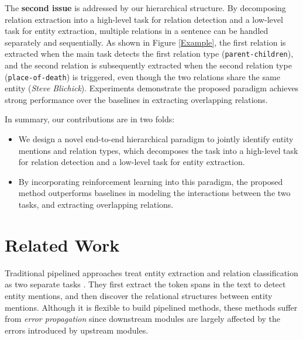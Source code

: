 \documentclass[letterpaper]{article} %
\theoremstyle{definition}
\begin{document}
The \textbf{second issue} is addressed by our hierarchical structure. By decomposing relation extraction into a high-level task for relation detection and a low-level task for entity extraction, multiple relations in a sentence can be handled separately and sequentially. As shown in Figure \ref{Example}, the first relation is extracted when the main task detects the first relation type (\texttt{parent-children}), and the second relation is subsequently extracted when the second relation type (\texttt{place-of-death}) is triggered, even though the two relations share the same entity (\textit{Steve Blichick}). Experiments demonstrate the proposed paradigm achieves strong performance over the baselines in extracting overlapping relations.

In summary, our contributions are in two folds:
\begin{itemize}

\item 
We design a novel end-to-end hierarchical paradigm to jointly identify entity mentions and relation types, which decomposes the task into a high-level task for relation detection and a low-level task for entity extraction. 

\item 
By incorporating reinforcement learning into this paradigm, the proposed method outperforms baselines in modeling the interactions between the two tasks, and extracting overlapping relations.
\end{itemize}



\section{Related Work}

Traditional pipelined approaches treat entity extraction and relation classification as two separate tasks \cite{mintz2009distant,gormley2015improved,tang2015line}. They first extract the token spans in the text to detect entity mentions, and then discover the relational structures between entity mentions. Although it is flexible to build pipelined methods, these methods suffer from \textit{error propagation} since downstream modules are largely affected by the errors introduced by upstream modules. 
\end{document}
